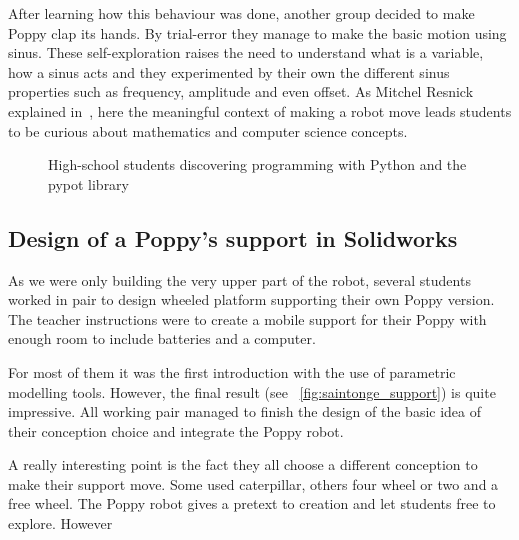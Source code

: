 After learning how this behaviour was done, another group decided to make Poppy clap its hands. By trial-error they manage to make the basic motion using sinus. These self-exploration raises the need to understand what is a variable, how a sinus acts and they experimented by their own the different sinus properties such as frequency, amplitude and even offset. As Mitchel Resnick explained in~\cite{resnick2009scratch}, here the meaningful context of making a robot move leads students to be curious about mathematics and computer science concepts.


\begin{figure}[]
\centering
    \hfil
    \hfil
    \hfil
    \caption{High-school students discovering programming with Python and the pypot library}
    \label{fig:saintonge_software}
\end{figure}

\subsection{Design of a Poppy's support in Solidworks} %

As we were only building the very upper part of the robot, several students worked in pair to design wheeled platform supporting their own Poppy version. The teacher instructions were to create a mobile support for their Poppy with enough room to include batteries and a computer.

For most of them it was the first introduction with the use of parametric modelling tools. However, the final result (see \figurename~\ref{fig:saintonge_support}) is quite impressive. All working pair managed to finish the design of the basic idea of their conception choice and integrate the Poppy robot.

A really interesting point is the fact they all choose a different conception to make their support move. Some used caterpillar, others four wheel or two and a free wheel. The Poppy robot gives a pretext to creation and let students free to explore. However


